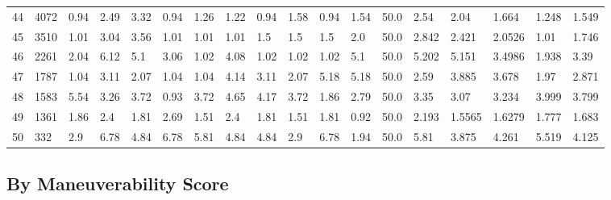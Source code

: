 \documentclass[landscape, 10pt]{report}
\begin{document}
\begin{longtable}{l || l || l | l | l | l | l | l | l | l | l | l | l || l | l | l | l | l}
44 & 4072 & 0.94 & 2.49 & 3.32 & 0.94 & 1.26 & 1.22 & 0.94 & 1.58 & 0.94 & 1.54 & 50.0 & 2.54 & 2.04 & 1.664 & 1.248 & 1.549\\ 
\rowcolor{lightgray}45 & 3510 & 1.01 & 3.04 & 3.56 & 1.01 & 1.01 & 1.01 & 1.5 & 1.5 & 1.5 & 2.0 & 50.0 & 2.842 & 2.421 & 2.0526 & 1.01 & 1.746\\ 
46 & 2261 & 2.04 & 6.12 & 5.1 & 3.06 & 1.02 & 4.08 & 1.02 & 1.02 & 1.02 & 5.1 & 50.0 & 5.202 & 5.151 & 3.4986 & 1.938 & 3.39\\ 
\rowcolor{lightgray}47 & 1787 & 1.04 & 3.11 & 2.07 & 1.04 & 1.04 & 4.14 & 3.11 & 2.07 & 5.18 & 5.18 & 50.0 & 2.59 & 3.885 & 3.678 & 1.97 & 2.871\\ 
48 & 1583 & 5.54 & 3.26 & 3.72 & 0.93 & 3.72 & 4.65 & 4.17 & 3.72 & 1.86 & 2.79 & 50.0 & 3.35 & 3.07 & 3.234 & 3.999 & 3.799\\ 
\rowcolor{lightgray}49 & 1361 & 1.86 & 2.4 & 1.81 & 2.69 & 1.51 & 2.4 & 1.81 & 1.51 & 1.81 & 0.92 & 50.0 & 2.193 & 1.5565 & 1.6279 & 1.777 & 1.683\\ 
50 & 332 & 2.9 & 6.78 & 4.84 & 6.78 & 5.81 & 4.84 & 4.84 & 2.9 & 6.78 & 1.94 & 50.0 & 5.81 & 3.875 & 4.261 & 5.519 & 4.125\\ 
\end{longtable} 
 
\pagebreak\subsection*{By Maneuverability Score} 
\end{document}
